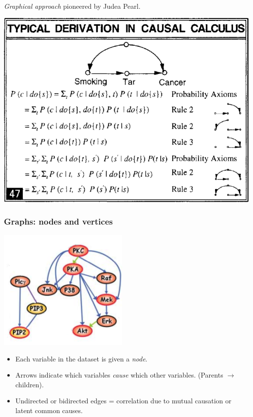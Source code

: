 \documentclass{beamer}
\begin{document}
\begin{frame}
\sectionpage

\emph{Graphical approach} pioneered by Judea Pearl.

\begin{center}
\includegraphics[scale = 0.2]{../images/pearl47.png}
\end{center}

\end{frame}

\begin{frame}
\frametitle{Graphs: nodes and vertices}

\begin{center}
\includegraphics[scale = 0.5]{../images/cyto_result_cropped3.png}
\end{center}

\begin{itemize}
\item Each variable in the dataset is given a \emph{node}.
\item Arrows indicate which variables \emph{cause} which other variables. (Parents $\to$ children).
\item Undirected or bidirected edges = correlation due to mutual causation or latent common causes.
\end{itemize}

\end{frame}
\end{document}
